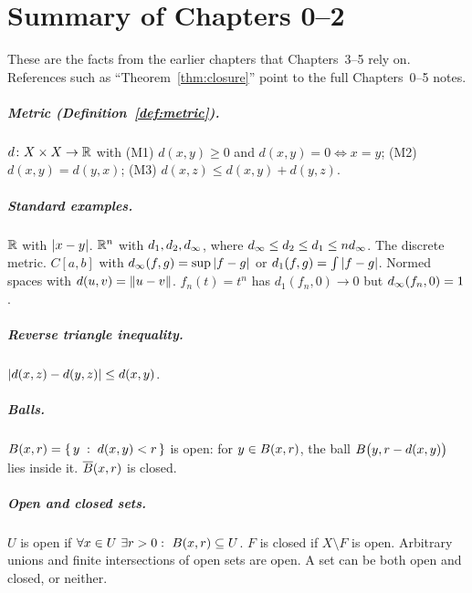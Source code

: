 \appendix

\iffull\else
\chapter{Summary of Chapters 0--2}\label{app:prereq}
These are the facts from the earlier chapters that Chapters~3--5 rely on. References such as ``Theorem~\ref{thm:closure}'' point to the full Chapters~0--5 notes.

\paragraph{Metric (Definition~\ref{def:metric}).} $d\colon X\times X\to\mathbb{R}$ with \textup{(M1)} $d(x,y)\ge0$ and $d(x,y)=0\iff x=y$; \textup{(M2)} $d(x,y)=d(y,x)$; \textup{(M3)} $d(x,z)\le d(x,y)+d(y,z)$.

\paragraph{Standard examples.} $\mathbb{R}$ with $\left\lvert x-y\right\rvert$. $\mathbb{R}^n$ with $d_1,d_2,d_\infty$, where $d_\infty\le d_2\le d_1\le nd_\infty$. The discrete metric. $C[a,b]$ with $d_\infty(f,g)=\sup\left\lvert f-g\right\rvert$ or $d_1(f,g)=\int\left\lvert f-g\right\rvert$. Normed spaces with $d(u,v)=\left\lVert u-v\right\rVert$. $f_n(t)=t^n$ has $d_1(f_n,0)\to0$ but $d_\infty(f_n,0)=1$.

\paragraph{Reverse triangle inequality.} $\left\lvert d(x,z)-d(y,z)\right\rvert\le d(x,y)$.

\paragraph{Balls.} $B(x,r)=\left\{\, y \;:\; d(x,y)<r \,\right\}$ is open: for $y\in B(x,r)$, the ball $B\bigl(y,r-d(x,y)\bigr)$ lies inside it. $\overline{B}(x,r)$ is closed.

\paragraph{Open and closed sets.} $U$ is open if $\forall x\in U\ \exists r>0:\ \Bo(x,r)\subseteq U$. $F$ is closed if $X\setminus F$ is open. Arbitrary unions and finite intersections of open sets are open. A set can be both open and closed, or neither.

